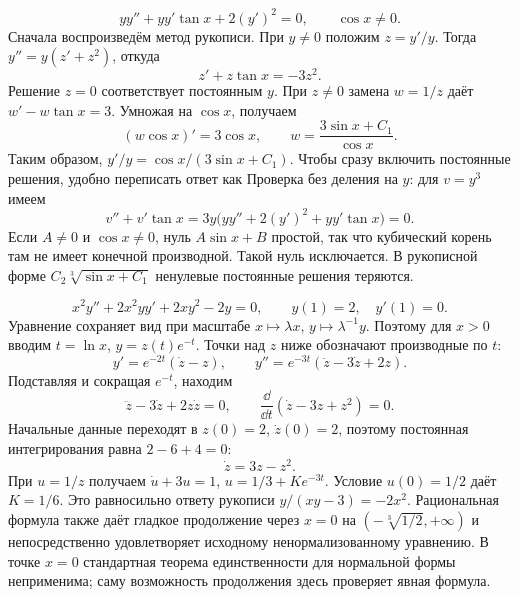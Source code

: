 \[
 yy''+yy'\tan x+2(y')^2=0,\qquad \cos x\ne0.
\]
Сначала воспроизведём метод рукописи. При $y\ne0$ положим $z=y'/y$.
Тогда $y''=y(z'+z^2)$, откуда
\[
 z'+z\tan x=-3z^2.
\]
Решение $z=0$ соответствует постоянным $y$. При $z\ne0$ замена
$w=1/z$ даёт $w'-w\tan x=3$. Умножая на $\cos x$, получаем
\[
 (w\cos x)'=3\cos x,\qquad w=\frac{3\sin x+C_1}{\cos x}.
\]
Таким образом, $y'/y=\cos x/(3\sin x+C_1)$.
Чтобы сразу включить постоянные решения, удобно переписать ответ как
Проверка без деления на $y$: для $v=y^3$ имеем
\[
 v''+v'\tan x=3y\bigl(yy''+2(y')^2+yy'\tan x\bigr)=0.
\]
Если $A\ne0$ и $\cos x\ne0$, нуль $A\sin x+B$ простой, так что
кубический корень там не имеет конечной производной. Такой нуль
исключается. В рукописной форме $C_2\sqrt[3]{\sin x+C_1}$ ненулевые
постоянные решения теряются.

\[
 x^2y''+2x^2yy'+2xy^2-2y=0,\qquad y(1)=2,\quad y'(1)=0.
\]
Уравнение сохраняет вид при масштабе $x\mapsto\lambda x$,
$y\mapsto\lambda^{-1}y$. Поэтому для $x>0$ вводим
$t=\ln x$, $y=z(t)e^{-t}$. Точки над $z$ ниже обозначают производные по $t$:
\[
 y'=e^{-2t}(\dot z-z),\qquad
 y''=e^{-3t}(\ddot z-3\dot z+2z).
\]
Подставляя и сокращая $e^{-t}$, находим
\[
 \ddot z-3\dot z+2z\dot z=0,
 \qquad \frac{\dd}{\dd t}(\dot z-3z+z^2)=0.
\]
Начальные данные переходят в $z(0)=2$, $\dot z(0)=2$, поэтому
постоянная интегрирования равна $2-6+4=0$:
\[
 \dot z=3z-z^2.
\]
При $u=1/z$ получаем $\dot u+3u=1$,
$u=1/3+Ke^{-3t}$. Условие $u(0)=1/2$ даёт $K=1/6$.
Это равносильно ответу рукописи $y/(xy-3)=-2x^2$.
Рациональная формула также даёт гладкое продолжение через $x=0$
на $(-\sqrt[3]{1/2},+\infty)$ и непосредственно удовлетворяет исходному
ненормализованному уравнению. В точке $x=0$ стандартная теорема
единственности для нормальной формы неприменима; саму возможность
продолжения здесь проверяет явная формула.

